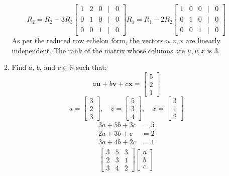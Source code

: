 \documentclass[11pt]{article}
\begin{document}
\begin{enumerate}
\begin{enumerate}
\[R_2 = R_2 - 3R_3
\begin{bmatrix}
    1 & 2 & 0 &|& 0 \\
    0 & 1 & 0 &|& 0 \\
    0 & 0 & 1 &|& 0
\end{bmatrix}
R_1 = R_1 - 2R_2
\begin{bmatrix}
    1 & 0 & 0 &|& 0 \\
    0 & 1 & 0 &|& 0 \\
    0 & 0 & 1 &|& 0
\end{bmatrix}
\]
As per the reduced row echelon form,  the vectors \( u, v, x \) are linearly independent. The rank of the matrix whose columns are \( u, v, x \) is 3.
\item  Find \(a\), \(b\), and \(c \in \mathbb{R}\) such that:
\[
    a\mathbf{u} + b\mathbf{v} + c\mathbf{x} = \begin{bmatrix} 5 \\ 2 \\ 1 \end{bmatrix}
\]
\[
    u = \begin{bmatrix}
        3 \\
        2 \\
        3
    \end{bmatrix}, \quad
    v = \begin{bmatrix}
        5 \\
        3 \\
        4
    \end{bmatrix}, \quad
    x = \begin{bmatrix}
        3 \\
        1 \\
        2
    \end{bmatrix}
\]
\[
\begin{aligned}
    3a + 5b + 3c &= 5 \\
    2a + 3b + c &= 2 \\
    3a + 4b + 2c &= 1
\end{aligned}
\]
\[
\begin{aligned}
    \begin{bmatrix}
        3 & 5 & 3 \\
        2 & 3 & 1 \\
        3 & 4 & 2
    \end{bmatrix}
    \begin{bmatrix}
        a \\
        b \\
        c
    \end{bmatrix}

\end{aligned}\]
\end{enumerate}
\end{enumerate}
\end{document}

